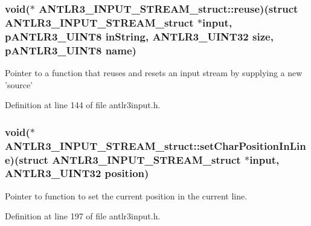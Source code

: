 \hypertarget{struct_a_n_t_l_r3___i_n_p_u_t___s_t_r_e_a_m__struct_af0d68334a6d2d6c73a1f32fd7c579682}{
\subsubsection[{reuse}]{\setlength{\rightskip}{0pt plus 5cm}void($\ast$ A\-N\-T\-L\-R3\-\_\-\-I\-N\-P\-U\-T\-\_\-\-S\-T\-R\-E\-A\-M\-\_\-struct\-::reuse)(struct {\bf A\-N\-T\-L\-R3\-\_\-\-I\-N\-P\-U\-T\-\_\-\-S\-T\-R\-E\-A\-M\-\_\-struct} $\ast$input, {\bf p\-A\-N\-T\-L\-R3\-\_\-\-U\-I\-N\-T8} in\-String, {\bf A\-N\-T\-L\-R3\-\_\-\-U\-I\-N\-T32} {\bf size}, {\bf p\-A\-N\-T\-L\-R3\-\_\-\-U\-I\-N\-T8} {\bf name})}}\label{struct_a_n_t_l_r3___i_n_p_u_t___s_t_r_e_a_m__struct_af0d68334a6d2d6c73a1f32fd7c579682}
Pointer to a function that reuses and resets an input stream by supplying a new 'source' 

Definition at line 144 of file antlr3input.\-h.

\hypertarget{struct_a_n_t_l_r3___i_n_p_u_t___s_t_r_e_a_m__struct_a8f2a47c8b7ffaea9466ba01a39b35bba}{
\subsubsection[{set\-Char\-Position\-In\-Line}]{\setlength{\rightskip}{0pt plus 5cm}void($\ast$ A\-N\-T\-L\-R3\-\_\-\-I\-N\-P\-U\-T\-\_\-\-S\-T\-R\-E\-A\-M\-\_\-struct\-::set\-Char\-Position\-In\-Line)(struct {\bf A\-N\-T\-L\-R3\-\_\-\-I\-N\-P\-U\-T\-\_\-\-S\-T\-R\-E\-A\-M\-\_\-struct} $\ast$input, {\bf A\-N\-T\-L\-R3\-\_\-\-U\-I\-N\-T32} position)}}\label{struct_a_n_t_l_r3___i_n_p_u_t___s_t_r_e_a_m__struct_a8f2a47c8b7ffaea9466ba01a39b35bba}
Pointer to function to set the current position in the current line. 

Definition at line 197 of file antlr3input.\-h.

